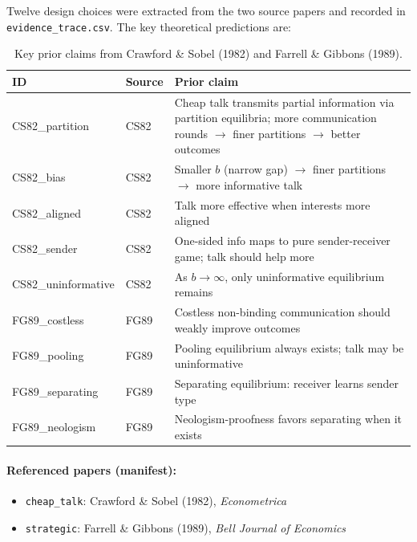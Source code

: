 \documentclass[11pt]{article}
\begin{document}
Twelve design choices were extracted from the two source papers and recorded in \texttt{evidence\_trace.csv}. The key theoretical predictions are:

\begin{table}[htbp]
\centering
\small
\begin{tabularx}{\textwidth}{@{}l l Y@{}}
\toprule
\textbf{ID} & \textbf{Source} & \textbf{Prior claim} \\
\midrule
CS82\_partition & CS82 & Cheap talk transmits partial information via partition equilibria; more communication rounds $\to$ finer partitions $\to$ better outcomes \\
CS82\_bias & CS82 & Smaller $b$ (narrow gap) $\to$ finer partitions $\to$ more informative talk \\
CS82\_aligned & CS82 & Talk more effective when interests more aligned \\
CS82\_sender & CS82 & One-sided info maps to pure sender-receiver game; talk should help more \\
CS82\_uninformative & CS82 & As $b \to \infty$, only uninformative equilibrium remains \\
FG89\_costless & FG89 & Costless non-binding communication should weakly improve outcomes \\
FG89\_pooling & FG89 & Pooling equilibrium always exists; talk may be uninformative \\
FG89\_separating & FG89 & Separating equilibrium: receiver learns sender type \\
FG89\_neologism & FG89 & Neologism-proofness favors separating when it exists \\
\bottomrule
\end{tabularx}
\caption{Key prior claims from Crawford \& Sobel (1982) and Farrell \& Gibbons (1989).}
\label{tab:prior-claims}
\end{table}

\paragraph{Referenced papers (manifest):}
\begin{itemize}
\item \texttt{cheap\_talk}: Crawford \& Sobel (1982), \textit{Econometrica}
\item \texttt{strategic}: Farrell \& Gibbons (1989), \textit{Bell Journal of Economics}
\end{itemize}

\end{document}
